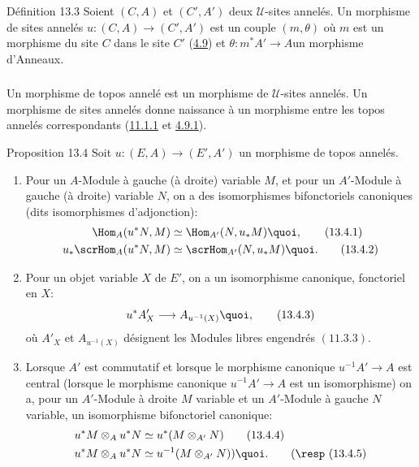 \documentclass[10pt]{../fichiers-configuration-latex/smfart}
\begin{document}
\begin{enonce*}{Définition 13.3}
Soient $(C,A)$ et $(C',A')$ deux $𝒰$-sites annelés. Un
morphisme de sites annelés $u:(C,A)\rightarrow (C',A')$ est un
couple $(m,\theta)$ où $m$ est un morphisme du site $C$ dans le site
$C'$ (\hyperref[IV.subsec4.9]{4.9}) et $\theta:m^{\ast}A'\rightarrow
A$\pageoriginale un morphisme d'Anneaux.
\end{enonce*}

\setcounter{subsection}{3} \setcounter{subsubsection}{0}
\subsubsection{}
Un morphisme de topos annelé est un morphisme de $𝒰$-sites
annelés. Un morphisme de sites annelés donne naissance à un
morphisme entre les topos annelés correspondants
(\hyperref[IV.subsubsec11.1.1]{11.1.1} et \hyperref[IV.subsubsec4.9.1]{4.9.1}).

\begin{enonce*}{Proposition 13.4}
Soit $u:(E,A)\rightarrow (E',A')$ un morphisme de topos annelés.
\begin{enumerate}
\renewcommand{\theenumi}{\alph{enumi}}
\renewcommand{\labelenumi}{\theenumi)}
\item Pour un $A$-Module à gauche (\resp à droite) variable $M$, et
pour un $A'$-Module à gauche (\resp à droite) variable $N$, on a des
isomorphismes bifonctoriels canoniques (dits isomorphismes
d'adjonction):
\begin{align*}
\Hom_A(u^{\ast}N,M) &\simeq
\Hom_{A'}(N,u_{\ast}M){\quoi},\tag{13.4.1}\\
u_{\ast}\scrHom_A(u^{\ast}N,M) &\simeq
\scrHom_{A'}(N,u_{\ast}M){\quoi}.\tag{13.4.2}
\end{align*}

\item Pour un objet variable $X$ de $E'$, on a un isomorphisme
canonique, fonctoriel en $X$:
\begin{equation*}
u^{\ast}A'_X\longrightarrow A_{u^{-1}(X)}{\quoi},\tag{13.4.3}
\end{equation*}
où $A'_X$ et $A_{u^{-1}(X)}$ désignent les Modules libres engendrés
$(\hyperref[IV.prop11.3.3]{11.3.3})$.

\item Lorsque $A'$ est commutatif et lorsque le morphisme canonique
$u^{-1}A'\rightarrow A$ est central (\resp lorsque le morphisme
canonique $u^{-1}A'\rightarrow A$ est un isomorphisme) on a, pour un
$A'$-Module à droite $M$ variable et un $A'$-Module à gauche $N$
variable, un isomorphisme bifonctoriel canonique:
\begin{align*}
u^{\ast}M\otimes_A u^{\ast}N &\simeq
u^{\ast}(M\otimes_{A'}N)\tag{13.4.4}\\
u^{\ast}M\otimes_A u^{\ast}N &\simeq
u^{-1}(M\otimes_{A'}N)){\quoi}.\tag*{(\resp (13.4.5)}
\end{align*}
\end{enumerate}
\end{enonce*}
\end{document}
